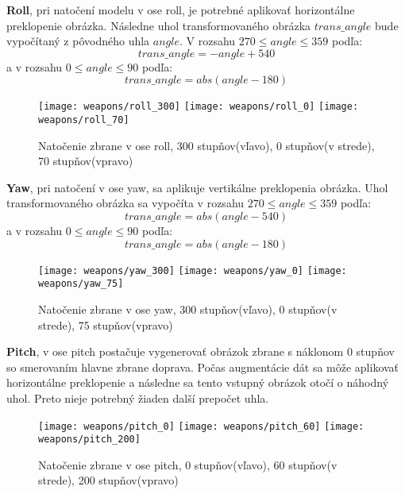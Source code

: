 \textbf{Roll}, pri natočení modelu v ose roll, je potrebné aplikovať horizontálne preklopenie obrázka.
Následne uhol transformovaného obrázka $trans\_angle$ bude vypočítaný z pôvodného uhla $angle$.
V rozsahu $270 \leq angle \leq 359$ podľa:
\begin{equation}
    trans\_angle = -angle + 540 
\end{equation}
a v rozsahu $0 \leq angle \leq 90$ podľa:
\begin{equation}
    trans\_angle = abs(angle - 180)
\end{equation}

\begin{figure}[H]
    \centering
    \texttt{[image: weapons/roll\_300]}
    \quad
    \texttt{[image: weapons/roll\_0]}
    \quad
    \texttt{[image: weapons/roll\_70]}
    \caption{Natočenie zbrane v ose roll, 300 stupňov(vľavo), 0 stupňov(v strede), 70 stupňov(vpravo)}
    \label{pic:rollrotation}
\end{figure}

\textbf{Yaw}, pri natočení v ose yaw, sa aplikuje vertikálne preklopenia obrázka.
Uhol transformovaného obrázka sa vypočíta v rozsahu $270 \leq angle \leq 359$ podľa:
\begin{equation}
    trans\_angle = abs(angle - 540)
\end{equation}
a v rozsahu $0 \leq angle \leq 90$ podľa:
\begin{equation}
    trans\_angle = abs(angle - 180)
\end{equation}

\begin{figure}[H]
    \centering
    \texttt{[image: weapons/yaw\_300]}
    \quad
    \texttt{[image: weapons/yaw\_0]}
    \quad
    \texttt{[image: weapons/yaw\_75]}
    \caption{Natočenie zbrane v ose yaw, 300 stupňov(vľavo), 0 stupňov(v strede), 75 stupňov(vpravo)}
    \label{pic:yawrotation}
\end{figure}

\textbf{Pitch}, v ose pitch postačuje vygenerovať obrázok zbrane s náklonom 0 stupňov so smerovaním hlavne zbrane doprava.
Počas augmentácie dát sa môže aplikovať horizontálne preklopenie a následne sa tento vstupný obrázok otočí o náhodný uhol.
Preto nieje potrebný žiaden další prepočet uhla.

\begin{figure}[H]
    \centering
    \texttt{[image: weapons/pitch\_0]}
    \quad
    \texttt{[image: weapons/pitch\_60]}
    \quad
    \texttt{[image: weapons/pitch\_200]}
    \caption{Natočenie zbrane v ose pitch, 0 stupňov(vľavo), 60 stupňov(v strede), 200 stupňov(vpravo)}
    \label{pic:yawrotation}
\end{figure}
